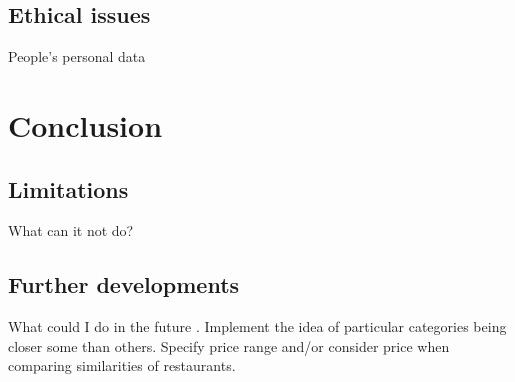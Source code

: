 \documentclass[conference]{IEEEtran}
\begin{document}
\subsection{Ethical issues}
People's personal data


\section{Conclusion}

\subsection{Limitations}
What can it not do?

\subsection{Further developments}
What could I do in the future \cite{5284958}. 
Implement the idea of particular categories being closer some than others. 
Specify price range and/or consider price when comparing similarities of restaurants. 




\end{document}
